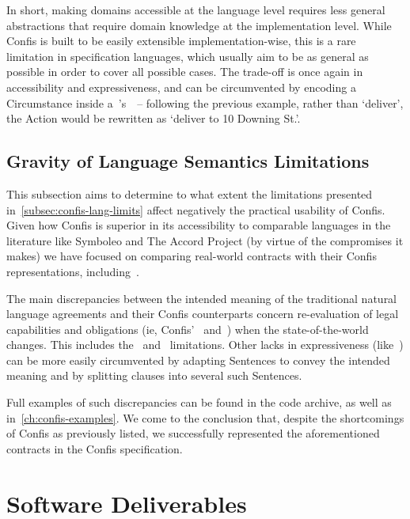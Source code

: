 In short, making domains accessible at the language level requires less general abstractions that require domain knowledge at the implementation level.
While Confis is built to be easily extensible implementation-wise, this is a rare limitation in specification languages, which usually aim to be as general as possible in order to cover all possible cases.
The trade-off is once again in accessibility and expressiveness, and can be circumvented by encoding a Circumstance inside a~'s~~-- following the previous example, rather than `deliver', the Action would be rewritten as `deliver to 10 Downing St.'.

\subsection{Gravity of Language Semantics Limitations}\label{subsec:gravity--lang-limits}

This subsection aims to determine to what extent the limitations presented in~\autoref{subsec:confis-lang-limits} affect negatively the practical usability of Confis.
Given how Confis is superior in its accessibility to comparable languages in the literature like Symboleo and The Accord Project (by virtue of the compromises it makes) we have focused on comparing real-world contracts with their Confis representations, including~\cite{economistIU2016licence, symboleoMeat, jetbrainsToolbox, seismicDataLicence}.

The main discrepancies between the intended meaning of the traditional natural language agreements and their Confis counterparts concern re-evaluation of legal capabilities and obligations (ie, Confis'~ and~) when the state-of-the-world changes.
This includes the~ and~ limitations.
Other lacks in expressiveness (like~) can be more easily circumvented by adapting Sentences to convey the intended meaning and by splitting clauses into several such Sentences.

Full examples of such discrepancies can be found in the code archive, as well as in~\autoref{ch:confis-examples}.
We come to the conclusion that, despite the shortcomings of Confis as previously listed, we successfully represented the aforementioned contracts in the Confis specification.


\section{Software Deliverables}\label{sec:software-deliverables}

